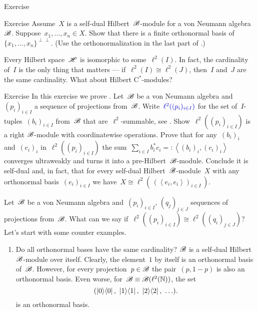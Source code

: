 \documentclass[b]{subfiles}
\begin{document}
\begin{parsec}
\begin{point}{Exercise}
\end{point}
\begin{point}{Exercise}%
Assume~$X$ is a self-dual Hilbert~$\mathscr{B}$-module for a von Neumann
    algebra~$\mathscr{B}$.
Suppose~$x_1, \ldots, x_n \in X$.
Show that there is a finite orthonormal basis
    of~$\{x_1, \ldots, x_n\}^{\perp\perp}$.
(Use the orthonormalization in the last part of .)
\end{point}
\end{parsec}


\begin{parsec}%
\begin{point}%
Every Hilbert space~$\mathscr{H}$ is isomorphic to some~$\ell^2(I)$.
In fact, the cardinality of~$I$ is the only thing that matters
    --- if~$\ell^2(I) \cong \ell^2(J)$, then~$I$ and~$J$
    are the same cardinality.
What about Hilbert C$^*$-modules?
\end{point}
\begin{point}[hilbmod-el2]{Exercise}%
In this exercise we prove \cite[Thm.~3.12]{paschke}.
Let~$\mathscr{B}$ be a von Neumann algebra
    and~$(p_i)_{i \in I}$
    a sequence of projections from~$\mathscr{B}$.
Write~$\Define{\ell^2((p_i)_{i \in I})}$
    for the set of~$I$-tuples~$(b_i)_{i \in I}$
        from~$\mathscr{B}$
        that are~$\ell^2$-summable, see .
Show~$\ell^2((p_i)_{i \in I})$
    is a right $\mathscr{B}$-module
    with coordinatewise operations.
Prove that for any~$(b_i)_i$ and~$(c_i)_i$
    in~$\ell^2((p_i)_{i \in I})$
    the sum~$\sum_{i \in I} b_i^* c_i =: \left<(b_i)_i, (c_i)_i\right>$
    converges ultraweakly
    and turns it into a pre-Hilbert~$\mathscr{B}$-module.
Conclude it is self-dual
and, in fact, that for every self-dual Hilbert~$\mathscr{B}$-module~$X$
    with any orthonormal basis~$(e_i)_{i \in I}$
    we have~$X \cong \ell^2(\,(\left<e_i,e_i\right>)_{i \in I}\,)$.
\end{point}

\begin{point}%
    Let~$\mathscr{B}$ be a von Neumann algebra
        and~$(p_i)_{i \in I}$, $(q_j)_{j \in J}$
        sequences of projections from~$\mathscr{B}$.
    What can we say if~$\ell^2((p_i)_{i \in I}) 
            \cong \ell^2((q_i)_{j \in J})$?
    Let's start with some counter examples.
\begin{enumerate}
\item
Do all orthonormal bases have the same cardinality?
$\mathscr{B}$ is a self-dual Hilbert~$\mathscr{B}$-module over itself.
Clearly, the element~$1$ by itself is an orthonormal basis of~$\mathscr{B}$.
However, for every projection~$p \in \mathscr{B}$
    the pair~$(p,1-p)$ is also an orthonormal basis.
    Even worse, for~$\mathscr{B} \equiv \mathscr{B}(\ell^2(\mathbb{N}))$,
        the set
\begin{equation*}
(\ketbra{0}{0}, \ \ketbra{1}{1},\  \ketbra{2}{2},\  \ldots ).
\end{equation*}
is an orthonormal basis.


\end{enumerate}
\end{point}
\end{parsec}
\end{document}

